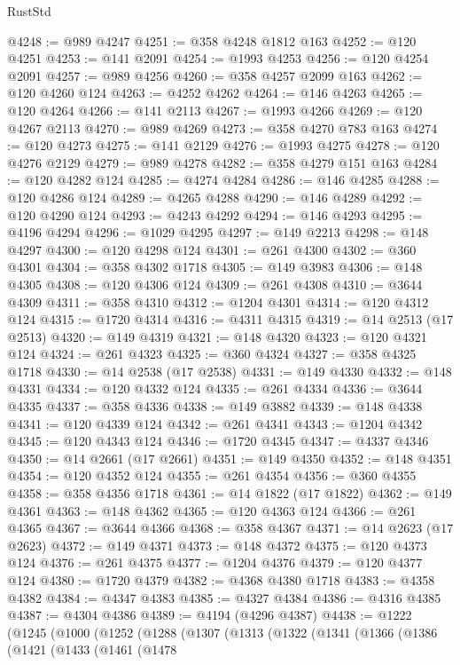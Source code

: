 \begin{lexlean}{RustStd}
\begin{coremodule}
@4248 := @989 @4247
@4251 := @358 @4248 @1812 @163
@4252 := @120 @4251
@4253 := @141 @2091
@4254 := @1993 @4253
@4256 := @120 @4254 @2091
@4257 := @989 @4256
@4260 := @358 @4257 @2099 @163
@4262 := @120 @4260 @124
@4263 := @4252 @4262
@4264 := @146 @4263
@4265 := @120 @4264
@4266 := @141 @2113
@4267 := @1993 @4266
@4269 := @120 @4267 @2113
@4270 := @989 @4269
@4273 := @358 @4270 @783 @163
@4274 := @120 @4273
@4275 := @141 @2129
@4276 := @1993 @4275
@4278 := @120 @4276 @2129
@4279 := @989 @4278
@4282 := @358 @4279 @151 @163
@4284 := @120 @4282 @124
@4285 := @4274 @4284
@4286 := @146 @4285
@4288 := @120 @4286 @124
@4289 := @4265 @4288
@4290 := @146 @4289
@4292 := @120 @4290 @124
@4293 := @4243 @4292
@4294 := @146 @4293
@4295 := @4196 @4294
@4296 := @1029 @4295
@4297 := @149 @2213
@4298 := @148 @4297
@4300 := @120 @4298 @124
@4301 := @261 @4300
@4302 := @360 @4301
@4304 := @358 @4302 @1718
@4305 := @149 @3983
@4306 := @148 @4305
@4308 := @120 @4306 @124
@4309 := @261 @4308
@4310 := @3644 @4309
@4311 := @358 @4310
@4312 := @1204 @4301
@4314 := @120 @4312 @124
@4315 := @1720 @4314
@4316 := @4311 @4315
@4319 := @14 @2513 (@17 @2513)
@4320 := @149 @4319
@4321 := @148 @4320
@4323 := @120 @4321 @124
@4324 := @261 @4323
@4325 := @360 @4324
@4327 := @358 @4325 @1718
@4330 := @14 @2538 (@17 @2538)
@4331 := @149 @4330
@4332 := @148 @4331
@4334 := @120 @4332 @124
@4335 := @261 @4334
@4336 := @3644 @4335
@4337 := @358 @4336
@4338 := @149 @3882
@4339 := @148 @4338
@4341 := @120 @4339 @124
@4342 := @261 @4341
@4343 := @1204 @4342
@4345 := @120 @4343 @124
@4346 := @1720 @4345
@4347 := @4337 @4346
@4350 := @14 @2661 (@17 @2661)
@4351 := @149 @4350
@4352 := @148 @4351
@4354 := @120 @4352 @124
@4355 := @261 @4354
@4356 := @360 @4355
@4358 := @358 @4356 @1718
@4361 := @14 @1822 (@17 @1822)
@4362 := @149 @4361
@4363 := @148 @4362
@4365 := @120 @4363 @124
@4366 := @261 @4365
@4367 := @3644 @4366
@4368 := @358 @4367
@4371 := @14 @2623 (@17 @2623)
@4372 := @149 @4371
@4373 := @148 @4372
@4375 := @120 @4373 @124
@4376 := @261 @4375
@4377 := @1204 @4376
@4379 := @120 @4377 @124
@4380 := @1720 @4379
@4382 := @4368 @4380 @1718
@4383 := @4358 @4382
@4384 := @4347 @4383
@4385 := @4327 @4384
@4386 := @4316 @4385
@4387 := @4304 @4386
@4389 := @4194 (@4296 @4387)
@4438 := @1222
    (@1245
      (@1000
        (@1252
          (@1288
            (@1307
              (@1313
                (@1322
                  (@1341
                    (@1366
                      (@1386
                        (@1421
                          (@1433
                            (@1461
                              (@1478

\end{coremodule}
\end{lexlean}
